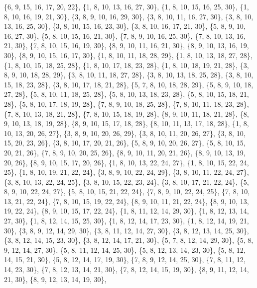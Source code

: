 \documentclass[11pt,a4paper]{article}
\begin{document}
{\{6, 9, 15, 16, 17, 20, 22\}, \{1, 8, 10, 13, 16, 27, 30\}, \{1, 8, 10, 15, 16, 25, 30\}, \{1, 8, 10, 16, 19, 21, 30\}, \{3, 8, 9, 10, 16, 29, 30\},
\{3, 8, 10, 11, 16, 27, 30\}, \{3, 8, 10, 13, 16, 25, 30\}, \{3, 8, 10, 15, 16, 23, 30\}, \{3, 8, 10, 16, 17, 21, 30\}, \{5, 8, 9, 10, 16, 27, 30\},
\{5, 8, 10, 15, 16, 21, 30\}, \{7, 8, 9, 10, 16, 25, 30\}, \{7, 8, 10, 13, 16, 21, 30\}, \{7, 8, 10, 15, 16, 19, 30\}, \{8, 9, 10, 11, 16, 21, 30\},
\{8, 9, 10, 13, 16, 19, 30\}, \{8, 9, 10, 15, 16, 17, 30\}, \{1, 8, 10, 11, 18, 28, 29\}, \{1, 8, 10, 13, 18, 27, 28\}, \{1, 8, 10, 15, 18, 25, 28\},
\{1, 8, 10, 17, 18, 23, 28\}, \{1, 8, 10, 18, 19, 21, 28\}, \{3, 8, 9, 10, 18, 28, 29\}, \{3, 8, 10, 11, 18, 27, 28\}, \{3, 8, 10, 13, 18, 25, 28\},
\{3, 8, 10, 15, 18, 23, 28\}, \{3, 8, 10, 17, 18, 21, 28\}, \{5, 7, 8, 10, 18, 28, 29\}, \{5, 8, 9, 10, 18, 27, 28\}, \{5, 8, 10, 11, 18, 25, 28\},
\{5, 8, 10, 13, 18, 23, 28\}, \{5, 8, 10, 15, 18, 21, 28\}, \{5, 8, 10, 17, 18, 19, 28\}, \{7, 8, 9, 10, 18, 25, 28\}, \{7, 8, 10, 11, 18, 23, 28\},
\{7, 8, 10, 13, 18, 21, 28\}, \{7, 8, 10, 15, 18, 19, 28\}, \{8, 9, 10, 11, 18, 21, 28\}, \{8, 9, 10, 13, 18, 19, 28\}, \{8, 9, 10, 15, 17, 18, 28\},
\{8, 10, 11, 13, 17, 18, 28\}, \{1, 8, 10, 13, 20, 26, 27\}, \{3, 8, 9, 10, 20, 26, 29\}, \{3, 8, 10, 11, 20, 26, 27\}, \{3, 8, 10, 15, 20, 23, 26\},
\{3, 8, 10, 17, 20, 21, 26\}, \{5, 8, 9, 10, 20, 26, 27\}, \{5, 8, 10, 15, 20, 21, 26\}, \{7, 8, 9, 10, 20, 25, 26\}, \{8, 9, 10, 11, 20, 21, 26\},
\{8, 9, 10, 13, 19, 20, 26\}, \{8, 9, 10, 15, 17, 20, 26\}, \{1, 8, 10, 13, 22, 24, 27\}, \{1, 8, 10, 15, 22, 24, 25\}, \{1, 8, 10, 19, 21, 22, 24\},
\{3, 8, 9, 10, 22, 24, 29\}, \{3, 8, 10, 11, 22, 24, 27\}, \{3, 8, 10, 13, 22, 24, 25\}, \{3, 8, 10, 15, 22, 23, 24\}, \{3, 8, 10, 17, 21, 22, 24\},
\{5, 8, 9, 10, 22, 24, 27\}, \{5, 8, 10, 15, 21, 22, 24\}, \{7, 8, 9, 10, 22, 24, 25\}, \{7, 8, 10, 13, 21, 22, 24\}, \{7, 8, 10, 15, 19, 22, 24\},
\{8, 9, 10, 11, 21, 22, 24\}, \{8, 9, 10, 13, 19, 22, 24\}, \{8, 9, 10, 15, 17, 22, 24\}, \{1, 8, 11, 12, 14, 29, 30\}, \{1, 8, 12, 13, 14, 27, 30\},
\{1, 8, 12, 14, 15, 25, 30\}, \{1, 8, 12, 14, 17, 23, 30\}, \{1, 8, 12, 14, 19, 21, 30\}, \{3, 8, 9, 12, 14, 29, 30\}, \{3, 8, 11, 12, 14, 27, 30\},
\{3, 8, 12, 13, 14, 25, 30\}, \{3, 8, 12, 14, 15, 23, 30\}, \{3, 8, 12, 14, 17, 21, 30\}, \{5, 7, 8, 12, 14, 29, 30\}, \{5, 8, 9, 12, 14, 27, 30\},
\{5, 8, 11, 12, 14, 25, 30\}, \{5, 8, 12, 13, 14, 23, 30\}, \{5, 8, 12, 14, 15, 21, 30\}, \{5, 8, 12, 14, 17, 19, 30\}, \{7, 8, 9, 12, 14, 25, 30\},
\{7, 8, 11, 12, 14, 23, 30\}, \{7, 8, 12, 13, 14, 21, 30\}, \{7, 8, 12, 14, 15, 19, 30\}, \{8, 9, 11, 12, 14, 21, 30\}, \{8, 9, 12, 13, 14, 19, 30\},
}
\end{document}
